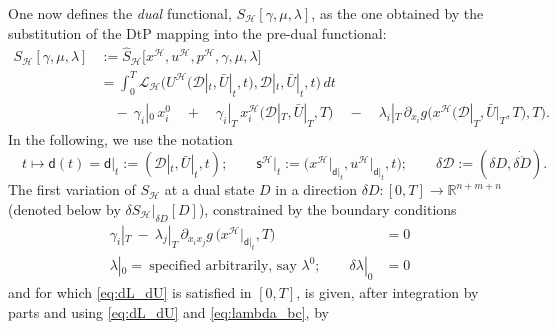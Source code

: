 \documentclass[11pt]{article}
\newcommand{\R}{\mathbb R}
\newcommand{\p}{\partial}
\newcommand{\dee}{\mathcal{D}}
\newcommand{\scl}{\mathcal{L}}
\newcommand{\sch}{\mathcal{H}}
\begin{document}
One now defines the \emph{dual} functional, $S_\sch[\gamma, \mu,\lambda]$, as the one obtained by the substitution of the DtP mapping into the pre-dual functional:
\begin{equation}\label{eq:pont_dual}
    \begin{aligned}
        S_\sch[\gamma, \mu,\lambda] & := \widehat{S}_\sch \Big[x^\sch,u^\sch,p^\sch, \gamma, \mu, \lambda \Big] \\
        & = \int_0^T \scl_{\sch}\Big(U^\sch\big( \dee|_t, \bar{U}|_t, t \big),\dee|_t, \bar{U}|_t, t \Big) \,dt \\ 
        & \quad - \ \gamma_i|_0 \, x^0_i \quad + \quad  \gamma_i|_T \, x_i^\sch\Big(\dee|_T,\bar{U}|_T,T \Big)  \quad - \quad   \lambda_i|_T \, \p_{x_i} g \Big(x^\sch \big(\dee|_T,\bar{U}|_T,T \big),T \Big).
    \end{aligned}
\end{equation}
In the following, we use the notation
\[
 \quad t \mapsto \mathsf{d}(t) = \mathsf{d}|_t := (\dee|_t,\bar{U}|_t,t) ; \qquad  \mathsf{s}^\sch \big|_t := \Big( x^\sch \Big|_{ \mathsf{d}|_t}, u^\sch \Big|_{ \mathsf{d}|_t}, t \Big); \qquad \delta \dee := (\delta D, \dot{\overline{\delta D}}).
\]
The first variation of $S_\sch$ at a dual state $D$ in a direction $\delta D: [0,T] \to \R^{n+m+n}$ (denoted below by  $\delta S_\sch|_{\delta D} [D]$), constrained by the boundary conditions
\begin{subequations}\label{eq:dual_bc}
\begin{align}
   \gamma_i|_T \ - \ \lambda_j|_T \, \p_{x_i x_j} g \, \Big( x^\sch \big|_{ \mathsf{d}|_t} , T \Big)  & = 0 \label{eq:gamma_bc}\\
   \lambda|_0 = \ \mbox{specified arbitrarily, say } \lambda^0; \qquad \delta \lambda|_0 & = 0 \label{eq:lambda_bc}
\end{align}
\end{subequations}
and for which \eqref{eq:dL_dU} is satisfied in $[0,T]$, is given, after integration by parts and using \eqref{eq:dL_dU} and \eqref{eq:lambda_bc}, by
\begingroup
\allowdisplaybreaks
\end{document}
